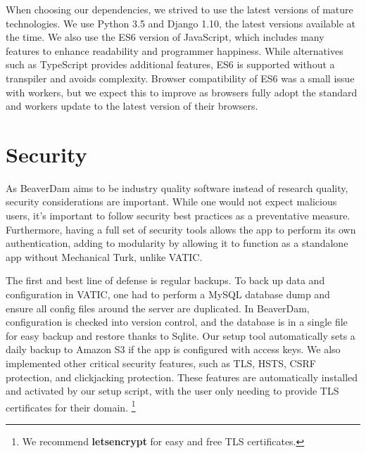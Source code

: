 When choosing our dependencies, we strived to use the latest versions of mature technologies.
We use Python 3.5 and Django 1.10, the latest versions available at the time.
We also use the ES6 version of JavaScript, which includes many features to enhance readability and programmer happiness.
While alternatives such as TypeScript provides additional features, ES6 is supported without a transpiler and avoids complexity.
Browser compatibility of ES6 was a small issue with workers, but we expect this to improve as browsers fully adopt the standard and workers update to the latest version of their browsers.

\section{Security}

As BeaverDam aims to be industry quality software instead of research quality, security considerations are important.
While one would not expect malicious users, it's important to follow security best practices as a preventative measure.
Furthermore, having a full set of security tools allows the app to perform its own authentication,
adding to modularity by allowing it to function as a standalone app without Mechanical Turk, unlike VATIC.

The first and best line of defense is regular backups.
To back up data and configuration in VATIC, one had to perform a MySQL database dump and ensure all config files around the server are duplicated.
In BeaverDam, configuration is checked into version control, and the database is in a single file for easy backup and restore thanks to Sqlite.
Our setup tool automatically sets a daily backup to Amazon S3 if the app is configured with access keys.
We also implemented other critical security features, such as TLS, HSTS, CSRF protection, and clickjacking protection.
These features are automatically installed and activated by our setup script,
with the user only needing to provide TLS certificates for their domain. \footnote{We recommend \textbf{letsencrypt} for easy and free TLS certificates.}



